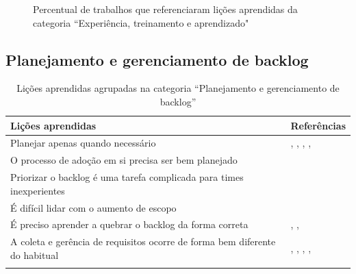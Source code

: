 \begin{figure}[H]
	\centering
	\captionsetup{justification=centering}
	\caption{Percentual de trabalhos que referenciaram lições aprendidas da categoria ``Experiência, treinamento e aprendizado"}
	\label{fig:exp}
\end{figure}

\subsection{Planejamento e gerenciamento de backlog}

\begin{table}[H]
	\centering
	\captionsetup{justification=centering}
	\begin{tabularx}{\linewidth}{ | X | p{5cm} | } \hline \textbf{Lições aprendidas} & \textbf{Referências} \\ \hline
		Planejar apenas quando necessário & \cite{Hajjdiab2011}, \cite{Fitzgerald2013}, \cite{Piegas2012}, \cite{Hui2013}, \cite{Parzinello2012} \\ \hline
		O processo de adoção em si precisa ser bem planejado & \cite{Hajjdiab2011} \\ \hline
		Priorizar o backlog é uma tarefa complicada para times inexperientes & \cite{Block2011} \\ \hline
		É difícil lidar com o aumento de escopo & \cite{Block2011} \\ \hline
		É preciso aprender a quebrar o backlog da forma correta & \cite{Adobe2012}, \cite{Hui2013}, \cite{Parzinello2012} \\ \hline
		A coleta e gerência de requisitos ocorre de forma bem diferente do habitual & \cite{Bustard2013}, \cite{Korhonen2010}, \cite{Claudia2013}, \cite{Piegas2012}, \cite{Hui2013} \\ \hline
	\caption{Lições aprendidas agrupadas na categoria ``Planejamento e gerenciamento de backlog''}
	\end{tabularx}
\end{table}

